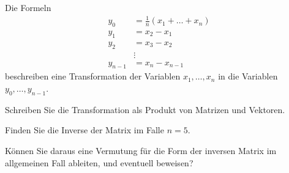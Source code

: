 Die Formeln \begin{align*}
y_0&=\frac1n(x_1+\dots + x_n)\\
y_1&=x_2-x_1\\
y_2&=x_3-x_2\\
&\vdots\\
y_{n-1}&=x_n-x_{n-1}
\end{align*}
beschreiben eine Transformation der Variablen $x_1,\dots,x_n$
in die Variablen $y_0,\dots,y_{n-1}$.
\begin{teilaufgaben}
\item Schreiben Sie die Transformation als Produkt von Matrizen und Vektoren.
\item Finden Sie die Inverse der Matrix im Falle $n=5$.
\item Können Sie daraus eine Vermutung für die Form der inversen Matrix im allgemeinen Fall
ableiten, und eventuell beweisen?
\end{teilaufgaben}


